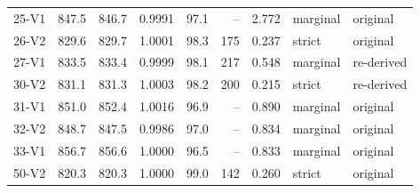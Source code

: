 \begin{tabular}{lrrrrrrll}
25-V1 & 847.5 & 846.7 & 0.9991 & 97.1 & -- & 2.772 & marginal & original \\
26-V2 & 829.6 & 829.7 & 1.0001 & 98.3 & 175 & 0.237 & strict & original \\
27-V1 & 833.5 & 833.4 & 0.9999 & 98.1 & 217 & 0.548 & marginal & re-derived \\
30-V2 & 831.1 & 831.3 & 1.0003 & 98.2 & 200 & 0.215 & strict & re-derived \\
31-V1 & 851.0 & 852.4 & 1.0016 & 96.9 & -- & 0.890 & marginal & original \\
32-V2 & 848.7 & 847.5 & 0.9986 & 97.0 & -- & 0.834 & marginal & original \\
33-V1 & 856.7 & 856.6 & 1.0000 & 96.5 & -- & 0.833 & marginal & original \\
50-V2 & 820.3 & 820.3 & 1.0000 & 99.0 & 142 & 0.260 & strict & original \\
\bottomrule
\end{tabular}
